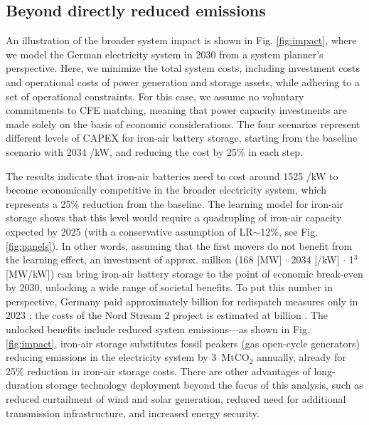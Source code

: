 \documentclass[pdflatex,sn-basic, Numbered]{sn-jnl}
\theoremstyle{thmstyleone}%
\theoremstyle{thmstyletwo}%
\theoremstyle{thmstylethree}%
\begin{document}
\subsection*{Beyond directly reduced emissions}\label{sec4}

An illustration of the broader system impact is shown in Fig. \ref{fig:impact}, where we model the German electricity system in 2030 from a system planner's perspective. Here, we minimize the total system costs, including investment costs and operational costs of power generation and storage assets, while adhering to a set of operational constraints. For this case, we assume no voluntary commitments to CFE matching, meaning that power capacity investments are made solely on the basis of economic considerations. The four scenarios represent different levels of CAPEX for iron-air battery storage, starting from the baseline scenario with 2034 \officialeuro/kW, and reducing the cost by 25\% in each step.

The results indicate that iron-air batteries need to cost around 1525 \officialeuro/kW to become economically competitive in the broader electricity system, which represents a 25\% reduction from the baseline. The learning model for iron-air storage shows that this level would require a quadrupling of iron-air capacity expected by 2025 (with a conservative assumption of LR$\sim$12\%, see Fig. \ref{fig:panels}). In other words, assuming that the first movers do not benefit from the learning effect, an investment of approx.  million (168 [MW] $\cdot$ 2034 [\officialeuro/kW] $\cdot$ 1$^3$ [MW/kW]) can bring iron-air battery storage to the point of economic break-even by 2030, unlocking a wide range of societal benefits. To put this number in perspective, Germany paid approximately  billion for redispatch measures only in 2023 \cite{ bnetzaBundesnetzagenturMonitoringberichte2023}; the  costs of the Nord Stream 2 project is estimated at  billion \cite{cleanenergywireNordStreamSymbol2018}. The unlocked benefits include reduced system emissions---as shown in Fig. \ref{fig:impact}, iron-air storage substitutes fossil peakers (gas open-cycle generators) reducing emissions in the electricity system by 3~MtCO$_2$ annually, already for 25\% reduction in iron-air storage costs. There are other advantages of long-duration storage technology deployment beyond the focus of this analysis, such as reduced curtailment of wind and solar generation, reduced need for additional transmission infrastructure, and increased energy security.
\end{document}
